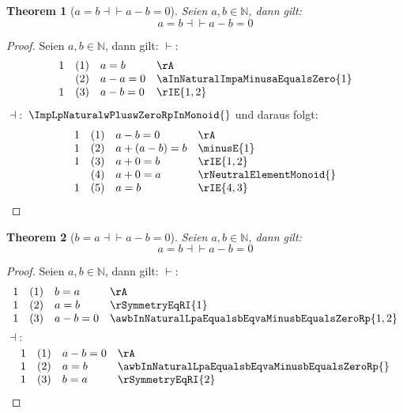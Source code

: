 \documentclass{book}
\theoremstyle{plain}
\newtheorem{theorem}{Theorem}
\theoremstyle{remark}
\theoremstyle{definition}
\begin{document}
\label{awbInNaturalLpaEqualsbEqvaMinusbEqualsZeroRp}
\begin{theorem}[\(a=b\dashv\vdash a-b=0\)]
Seien \(a,b\in\mathbb{N}\), dann gilt:
\[a=b\dashv\vdash a-b=0\]
\end{theorem}
\begin{proof}
        Seien \(a,b\in\mathbb{N}\), dann gilt:
\(\vdash:\)
	\[
	\begin{array}{llll}
		1 & (1) & a=b & \rA \\
		   & (2) & a-a=0 & \aInNaturalImpaMinusaEqualsZero{1} \\
            1 & (3) & a-b=0 & \rIE{1,2} \\
	\end{array}
	\]
	\(\dashv:\)
    \(\ImpLpNaturalwPluswZeroRpInMonoid{}\) und daraus folgt:
	\[
	\begin{array}{llll}
		1 & (1) & a-b = 0 & \rA \\
            1 & (2) & a+(a-b)=b & \minusE{1} \\
            1 & (3) & a+0=b & \rIE{1,2} \\
              & (4) & a+0=a & \rNeutralElementMonoid{} \\
            1 & (5) & a=b & \rIE{4,3} \\
	\end{array}
	\]
\end{proof}

\label{awbInNaturalLpbEqualsaEqvaMinusbEqualsZeroRp}
\begin{theorem}[\(b=a\dashv\vdash a-b=0\)]
Seien \(a,b\in\mathbb{N}\), dann gilt:
\[a=b\dashv\vdash a-b=0\]
\end{theorem}
\begin{proof}
        Seien \(a,b\in\mathbb{N}\), dann gilt:
\(\vdash:\)
	\[
	\begin{array}{llll}
		1 & (1) & b=a & \rA \\
		  1 & (2) & a=b & \rSymmetryEqRI{1} \\
            1 & (3) & a-b=0 & \awbInNaturalLpaEqualsbEqvaMinusbEqualsZeroRp{1,2} \\
	\end{array}
	\]
	\(\dashv:\)
	\[
	\begin{array}{llll}
		1 & (1) & a-b = 0 & \rA \\
            1 & (2) & a=b & \awbInNaturalLpaEqualsbEqvaMinusbEqualsZeroRp{} \\
            1 & (3) & b=a & \rSymmetryEqRI{2} \\
	\end{array}
	\]
\end{proof}
\end{document}
